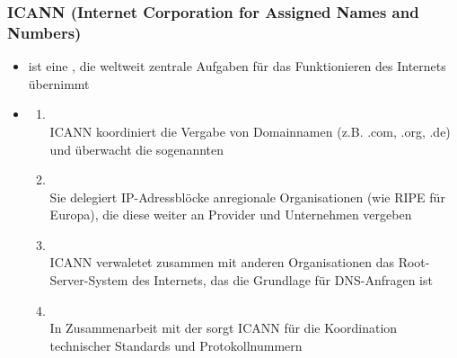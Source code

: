 \subsubsection*{ICANN (Internet Corporation for Assigned Names and Numbers)}
\begin{itemize}
    \item {} ist eine , die weltweit zentrale Aufgaben für das Funktionieren des Internets übernimmt
    \item {}
    \begin{enumerate}
        \item {}\\
        ICANN koordiniert die Vergabe von Domainnamen (z.B. .com, .org, .de) und überwacht die sogenannten 
        \item {}\\
        Sie delegiert IP-Adressblöcke anregionale Organisationen (wie RIPE für Europa), die diese weiter an Provider und Unternehmen vergeben
        \item {}\\
        ICANN verwaletet zusammen mit anderen Organisationen das Root-Server-System des Internets, das die Grundlage für DNS-Anfragen ist
        \item  {}\\
        In Zusammenarbeit mit der  sorgt ICANN für die Koordination technischer Standards und Protokollnummern
    \end{enumerate}
\end{itemize}
